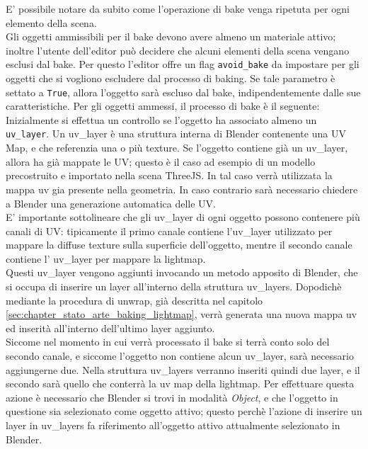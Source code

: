 E’ possibile notare da subito come l’operazione di bake venga ripetuta per ogni elemento della scena.
\\
Gli oggetti ammissibili per il bake devono avere almeno un materiale attivo; inoltre l’utente dell’editor può decidere che alcuni elementi della scena vengano esclusi dal bake. Per questo l’editor offre un flag \texttt{avoid\_bake} da impostare per gli oggetti che si vogliono escludere dal processo di baking. Se tale parametro è settato a \texttt{True}, allora l’oggetto sarà escluso dal bake, indipendentemente dalle sue caratteristiche. 
Per gli oggetti ammessi, il processo di bake è il seguente:
\\
Inizialmente si effettua un controllo se l’oggetto ha associato almeno un \texttt{uv\_layer}. Un uv\_layer è una struttura interna di Blender contenente una UV Map, e che referenzia una o più texture. Se l’oggetto contiene già un uv\_layer, allora ha già mappate le UV; questo è il caso ad esempio di un modello precostruito e importato nella scena ThreeJS. In tal caso verrà utilizzata la mappa uv gia presente nella geometria. In caso contrario sarà necessario chiedere a Blender una generazione automatica delle UV. 
\\
E’ importante sottolineare che gli uv\_layer di ogni oggetto possono contenere più canali di UV: tipicamente il primo canale contiene l’uv\_layer utilizzato per mappare la diffuse texture sulla superficie dell’oggetto, mentre il secondo canale contiene l’ uv\_layer per mappare la lightmap.
\\
Questi uv\_layer vengono aggiunti invocando un metodo apposito di Blender, che si occupa di inserire un layer all’interno della struttura uv\_layers. Dopodichè mediante la procedura di unwrap, già descritta nel capitolo \ref{sec:chapter_stato_arte_baking_lightmap}, verrà generata una nuova mappa uv ed inserità all’interno dell’ultimo layer aggiunto. 
\\
Siccome nel momento in cui verrà processato il bake si terrà conto solo del secondo canale, e siccome l’oggetto non contiene alcun uv\_layer, sarà necessario aggiungerne due.
Nella struttura uv\_layers verranno inseriti quindi due layer, e il secondo sarà quello che conterrà la uv map della lightmap. Per effettuare questa azione è necessario che Blender si trovi in modalità \emph{Object}, e che l’oggetto in questione sia selezionato come oggetto attivo; questo perchè l’azione di inserire un layer in uv\_layers fa riferimento all’oggetto attivo attualmente selezionato in Blender. 
\\ 
